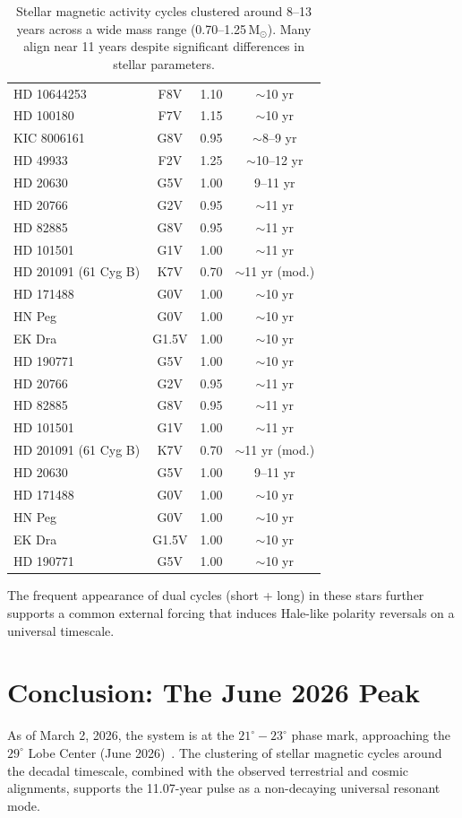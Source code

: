 \documentclass[12pt]{article}
\begin{document}
\begin{table}[H]
\begin{tabular}{lccc}
HD 10644253 & F8V & 1.10 & $\sim$10 yr \\
HD 100180 & F7V & 1.15 & $\sim$10 yr \\
KIC 8006161 & G8V & 0.95 & $\sim$8--9 yr \\
HD 49933 & F2V & 1.25 & $\sim$10--12 yr \\
HD 20630 & G5V & 1.00 & 9--11 yr \\
HD 20766 & G2V & 0.95 & $\sim$11 yr \\
HD 82885 & G8V & 0.95 & $\sim$11 yr \\
HD 101501 & G1V & 1.00 & $\sim$11 yr \\
HD 201091 (61 Cyg B) & K7V & 0.70 & $\sim$11 yr (mod.) \\
HD 171488 & G0V & 1.00 & $\sim$10 yr \\
HN Peg & G0V & 1.00 & $\sim$10 yr \\
EK Dra & G1.5V & 1.00 & $\sim$10 yr \\
HD 190771 & G5V & 1.00 & $\sim$10 yr \\
HD 20766 & G2V & 0.95 & $\sim$11 yr \\
HD 82885 & G8V & 0.95 & $\sim$11 yr \\
HD 101501 & G1V & 1.00 & $\sim$11 yr \\
HD 201091 (61 Cyg B) & K7V & 0.70 & $\sim$11 yr (mod.) \\
HD 20630 & G5V & 1.00 & 9--11 yr \\
HD 171488 & G0V & 1.00 & $\sim$10 yr \\
HN Peg & G0V & 1.00 & $\sim$10 yr \\
EK Dra & G1.5V & 1.00 & $\sim$10 yr \\
HD 190771 & G5V & 1.00 & $\sim$10 yr \\
\bottomrule
\end{tabular}
\caption{Stellar magnetic activity cycles clustered around 8--13 years across a wide mass range (0.70--1.25\,M$_\odot$). Many align near 11 years despite significant differences in stellar parameters.}
\end{table}

The frequent appearance of dual cycles (short + long) in these stars further supports a common external forcing that induces Hale-like polarity reversals on a universal timescale.

\section{Conclusion: The June 2026 Peak}
As of March 2, 2026, the system is at the $21^\circ - 23^\circ$ phase mark, approaching the $29^\circ$ Lobe Center (June 2026)~\cite{3,36}. The clustering of stellar magnetic cycles around the decadal timescale, combined with the observed terrestrial and cosmic alignments, supports the 11.07-year pulse as a non-decaying universal resonant mode.
\end{document}
